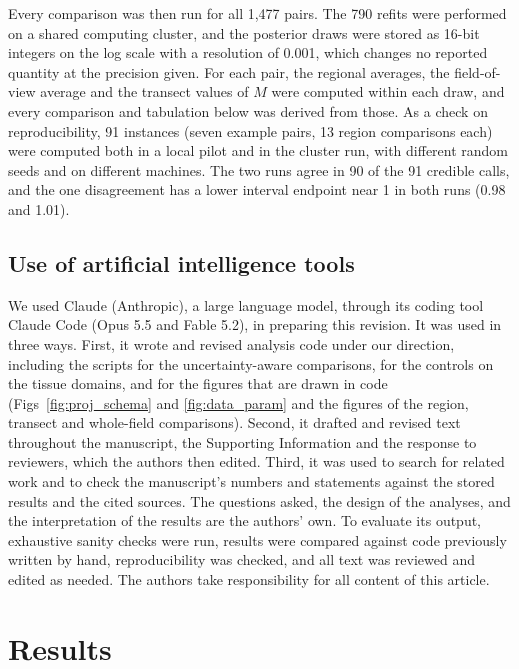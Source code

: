 \documentclass[10pt,letterpaper]{article}
\begin{document}
Every comparison was then run for all 1,477 pairs. The 790 refits were performed on a shared computing cluster, and the posterior draws were stored as 16-bit integers on the log scale with a resolution of 0.001, which changes no reported quantity at the precision given. For each pair, the regional averages, the field-of-view average and the transect values of $M$ were computed within each draw, and every comparison and tabulation below was derived from those. As a check on reproducibility, 91 instances (seven example pairs, 13 region comparisons each) were computed both in a local pilot and in the cluster run, with different random seeds and on different machines. The two runs agree in 90 of the 91 credible calls, and the one disagreement has a lower interval endpoint near 1 in both runs (0.98 and 1.01).

\subsection*{Use of artificial intelligence tools}

We used Claude (Anthropic), a large language model, through its coding tool Claude Code (Opus 5.5 and Fable 5.2), in preparing this revision. It was used in three ways. First, it wrote and revised analysis code under our direction, including the scripts for the uncertainty-aware comparisons, for the controls on the tissue domains, and for the figures that are drawn in code (Figs~\ref{fig:proj_schema} and \ref{fig:data_param} and the figures of the region, transect and whole-field comparisons). Second, it drafted and revised text throughout the manuscript, the Supporting Information and the response to reviewers, which the authors then edited. Third, it was used to search for related work and to check the manuscript's numbers and statements against the stored results and the cited sources. The questions asked, the design of the analyses, and the interpretation of the results are the authors' own. To evaluate its output, exhaustive sanity checks were run, results were compared against code previously written by hand, reproducibility was checked, and all text was reviewed and edited as needed. The authors take responsibility for all content of this article.

\section*{Results}
\end{document}
